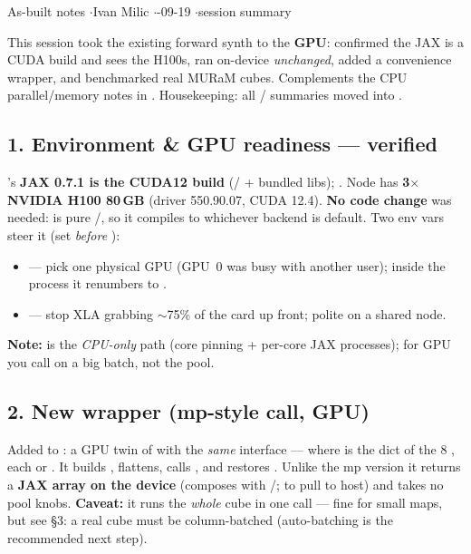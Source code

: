 


%
{As-built notes \quad$\cdot$\quad Ivan Milic \quad$\cdot$-09-19 \quad$\cdot$\quad session summary}

This session took the existing forward synth to the \textbf{GPU}: confirmed the 
JAX is a CUDA build and sees the H100s, ran  on-device \emph{unchanged}, added a
convenience wrapper, and benchmarked real MURaM cubes. Complements the CPU parallel/memory notes in
. Housekeeping: all / summaries moved into
.

\subsection*{1. Environment \& GPU readiness --- verified}
's \textbf{JAX 0.7.1 is the CUDA12 build} (/ +
bundled  libs); . Node has \textbf{3$\times$ NVIDIA
H100 80\,GB} (driver 550.90.07, CUDA 12.4). \textbf{No code change} was needed:  is pure
/, so it compiles to whichever backend is default. Two env vars steer it (set
\emph{before} ):
\begin{itemize}
  \item {} --- pick one physical GPU (GPU~0 was busy with another user);
        inside the process it renumbers to .
  \item {} --- stop XLA grabbing $\sim$75\% of the card up
        front; polite on a shared node.
\end{itemize}
\textbf{Note:}  is the \emph{CPU-only} path (core pinning + per-core JAX processes);
for GPU you call  on a big batch, not the pool.

\subsection*{2. New wrapper  (mp-style call, GPU)}
Added to : a GPU twin of  with the \emph{same} interface ---
 where  is the dict of the 8
, each  or . It builds , flattens, calls
, and restores . Unlike the mp version it returns a \textbf{JAX
array on the device} (composes with /;  to pull to host) and takes
no pool knobs. \textbf{Caveat:} it runs the \emph{whole} cube in one call --- fine for small maps, but see
\S3: a real cube must be column-batched (auto-batching is the recommended next step).

